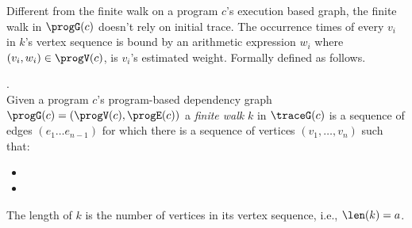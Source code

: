 Different from the finite walk on a program $c$'s execution based graph,
the finite walk in $\progG(c)$ doesn't rely on initial trace.
The occurrence times of every $v_i $ in $k$'s vertex sequence is bound by 
an arithmetic expression $w_i$ where $(v_i, w_i) \in \progV(c)$, is $v_i$'s estimated weight. 
%
Formally defined as follows.
\begin{defn}.
  \label{def:prog_finitewalk}
  \\
  Given a program $c$'s program-based dependency graph 
  $\progG({c}) = (\progV(c), \progE(c))$
  a \emph{finite walk} $k$ in $\traceG({c})$ is
  a sequence of edges $(e_1 \ldots e_{n - 1})$ 
  for which there is a sequence of vertices 
  $(v_1, \ldots, v_{n})$ such that:
  \begin{itemize}
      \item 
      \item 
  \end{itemize}
  The length of $k$ is the number of vertices in its vertex sequence, i.e., $\len(k) = a$.
 \end{defn}
